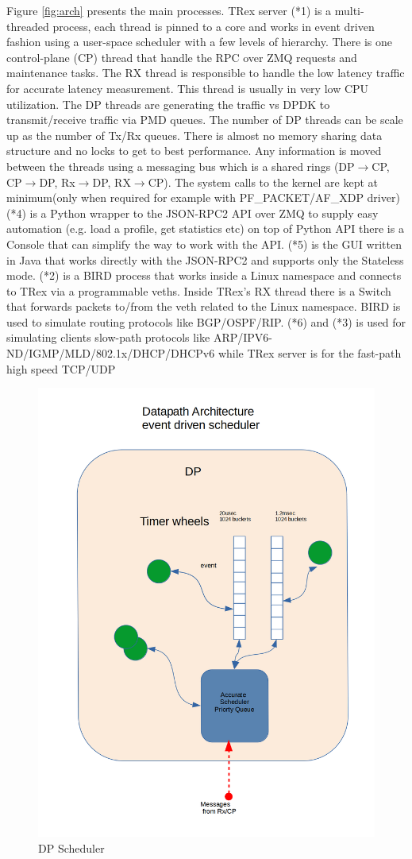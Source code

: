 \documentclass[conference]{IEEEtran}
\begin{document}
Figure \ref{fig:arch} presents the main processes. TRex server (*1) is a multi-threaded process, each thread is pinned to a core and works in 
event driven fashion using a user-space scheduler with a few levels of hierarchy. There is one control-plane (CP) thread that handle the RPC over ZMQ requests and maintenance tasks. 
The RX thread is responsible to handle the low latency traffic for accurate latency measurement. This thread is usually in very low CPU utilization. 
The DP threads are generating the traffic vs DPDK to transmit/receive traffic via PMD queues. 
The number of DP threads can be scale up as the number of Tx/Rx queues. 
There is almost no memory sharing data structure and no locks to get to best performance. 
Any information is moved between the threads using a messaging bus which 
is a shared rings (DP$\rightarrow$CP, CP$\rightarrow$DP, Rx$\rightarrow$DP, RX$\rightarrow$CP).
The system calls to the kernel are kept at minimum(only when required for example with PF\_PACKET/AF\_XDP driver)
(*4) is a Python wrapper to the JSON-RPC2 API over ZMQ to supply easy automation (e.g. load a profile, get statistics etc)
on top of Python API there is a Console that can simplify the way to work with the API. 
(*5) is the GUI written in Java that works directly with the JSON-RPC2 and supports only the Stateless mode.
(*2) is a BIRD \cite{b4} process that works inside a Linux namespace and connects to TRex via a programmable veths. Inside TRex's RX thread there is a Switch that forwards packets to/from the veth related to the Linux namespace. 
BIRD is used to simulate routing protocols like BGP/OSPF/RIP.
(*6) and (*3) is used for simulating clients slow-path protocols like ARP/IPV6-ND/IGMP/MLD/802.1x/DHCP/DHCPv6 while TRex server is for the fast-path high speed TCP/UDP

\begin{figure}[h]
  \includegraphics[width=0.3
  \textwidth, center]{trex_dp_sheduler.png}
  \caption{DP Scheduler}
  \label{fig:dp_schduler}
\end{figure}
  
\end{document}
